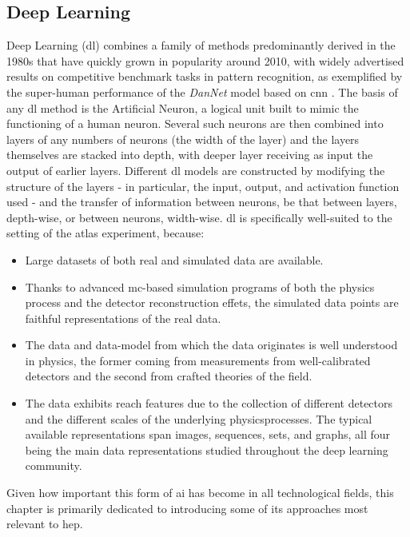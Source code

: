 \subsection{Deep Learning} 
Deep Learning (\gls{dl}) combines a family of methods predominantly derived in the 1980s that have quickly grown in popularity around 2010, with widely advertised results on competitive benchmark tasks in pattern recognition, as exemplified by the super-human performance of the \textit{DanNet} model \cite{DanNet} based on \gls{cnn} \cite{NIPS198953c3bce6}. The basis of any \gls{dl} method is the Artificial Neuron, a logical unit built to mimic the functioning of a human neuron. Several such neurons are then combined into layers of any numbers of neurons (the width of the layer) and the layers themselves are stacked into depth, with deeper layer receiving as input the output of earlier layers. Different \gls{dl} models are constructed by modifying the structure of the layers - in particular, the input, output, and activation function used - and the transfer of information between neurons, be that between layers, depth-wise, or between neurons, width-wise. \gls{dl} is specifically well-suited to the setting of the \gls{atlas} experiment, because:
\begin{itemize}
    \item Large datasets of both real and simulated data are available.
    \item Thanks to advanced \gls{mc}-based simulation programs of both the physics process and the detector reconstruction effets, the simulated data points are faithful representations of the real data.
    \item The data and data-model from which the data originates is well understood in physics, the former coming from measurements from well-calibrated detectors and the second from crafted theories of the field. 
    \item The data exhibits reach features due to the collection of different detectors and the different scales of the underlying physicsprocesses. The typical available representations span images, sequences, sets, and graphs, all four being the main data representations studied throughout the deep learning community.
\end{itemize}
Given how important this form of \gls{ai} has become in all technological fields, this chapter is primarily dedicated to introducing some of its approaches most relevant to \gls{hep}. 


